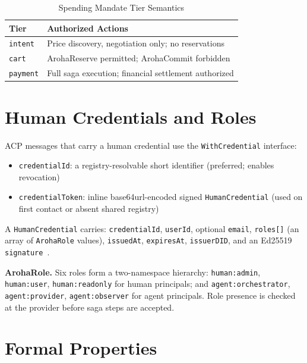 \documentclass[conference]{IEEEtran}
\begin{document}
\begin{table}[t]
\centering
\caption{Spending Mandate Tier Semantics}
\label{tab:mandates}
{\small
\begin{tabular}{@{}lp{4.5cm}@{}}
\toprule
\textbf{Tier} & \textbf{Authorized Actions} \\
\midrule
\texttt{intent}  & Price discovery, negotiation only; no reservations \\
\texttt{cart}    & ArohaReserve permitted; ArohaCommit forbidden \\
\texttt{payment} & Full saga execution; financial settlement authorized \\
\bottomrule
\end{tabular}
}
\end{table}

\section{Human Credentials and Roles}
\label{sec:credentials}

ACP messages that carry a human credential use the
\texttt{WithCredential} interface:
\begin{itemize}
  \item \texttt{credentialId}: a registry-resolvable short identifier
        (preferred; enables revocation)
  \item \texttt{credentialToken}: inline base64url-encoded signed
        \texttt{HumanCredential} (used on first contact or absent
        shared registry)
\end{itemize}
A \texttt{HumanCredential} carries: \texttt{credentialId},
\texttt{userId}, optional \texttt{email}, \texttt{roles[]} (an array
of \texttt{ArohaRole} values), \texttt{issuedAt}, \texttt{expiresAt},
\texttt{issuerDID}, and an Ed25519 \texttt{signature}~\cite{bernstein2011ed25519}.

\textbf{ArohaRole.}  Six roles form a two-namespace hierarchy:
\texttt{human:admin}, \texttt{human:user}, \texttt{human:readonly}
for human principals; and \texttt{agent:orchestrator},
\texttt{agent:provider}, \texttt{agent:observer} for agent principals.
Role presence is checked at the provider before saga steps are accepted.

\section{Formal Properties}
\label{sec:formal}
\end{document}

